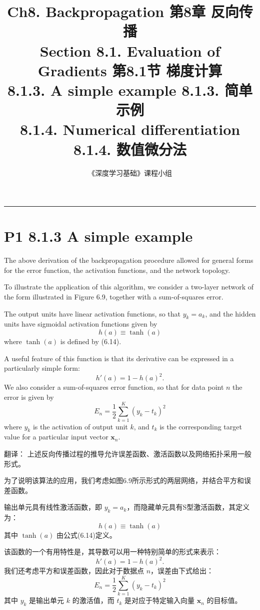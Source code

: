 \documentclass{article}
\title{Ch8. Backpropagation \hfill 第8章 反向传播 \\ 
Section 8.1. Evaluation of Gradients \hfill 第8.1节 梯度计算 \\ 
8.1.3. A simple example \hfill 8.1.3. 简单示例 \\
8.1.4. Numerical differentiation \hfill 8.1.4. 数值微分法}
\author{《深度学习基础》课程小组}
\begin{document}
\maketitle

\setlength{\parindent}{0pt} %
\setlength{\parskip}{1.5em} %

\noindent\rule{\linewidth}{0.4pt}

\section{P1 8.1.3 A simple example}

The above derivation of the backpropagation procedure allowed for general forms for the error function, the activation functions, and the network topology. 

To illustrate the application of this algorithm, we consider a two-layer network of the form illustrated in Figure 6.9, together with a sum-of-squares error. 

The output units have linear activation functions, so that $y_k = a_k$, and the hidden units have sigmoidal activation functions given by
\begin{equation}
h(a) \equiv \tanh(a) \tag{8.15}
\end{equation}
where $\tanh(a)$ is defined by (6.14). 

A useful feature of this function is that its derivative can be expressed in a particularly simple form:
\begin{equation}
h'(a) = 1 - h(a)^2. 
\tag{8.16}
\end{equation}
We also consider a sum-of-squares error function, so that for data point $n$ the error is given by
\begin{equation}
E_n = \frac{1}{2} \sum_{k=1}^K (y_k - t_k)^2 \tag{8.17}
\end{equation}
where $y_k$ is the activation of output unit $k$, and $t_k$ is the corresponding target value for a particular input vector $\mathbf{x}_n$.

{\color{red}
翻译：
上述反向传播过程的推导允许误差函数、激活函数以及网络拓扑采用一般形式。

为了说明该算法的应用，我们考虑如图6.9所示形式的两层网络，并结合平方和误差函数。

输出单元具有线性激活函数，即 $y_k = a_k$，而隐藏单元具有S型激活函数，其定义为：
\begin{equation}
h(a) \equiv \tanh(a) \tag{8.15}
\end{equation}
其中 $\tanh(a)$ 由公式(6.14)定义。

该函数的一个有用特性是，其导数可以用一种特别简单的形式来表示：
\begin{equation}
h'(a) = 1 - h(a)^2. 
\tag{8.16}
\end{equation}
我们还考虑平方和误差函数，因此对于数据点 $n$，误差由下式给出：
\begin{equation}
E_n = \frac{1}{2} \sum_{k=1}^K (y_k - t_k)^2 \tag{8.17}
\end{equation}
其中 $y_k$ 是输出单元 $k$ 的激活值，而 $t_k$ 是对应于特定输入向量 $\mathbf{x}_n$ 的目标值。
}
\end{document}
